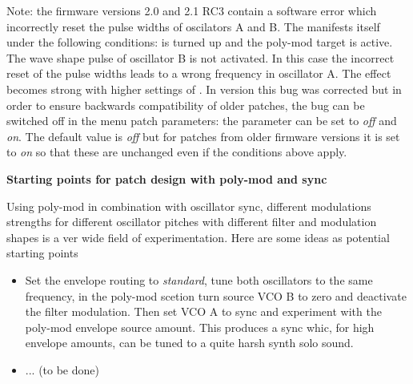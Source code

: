 Note: the firmware versions 2.0 and 2.1 RC3 contain a software error which incorrectly reset the pulse widths of oscilators A and B. The manifests itself under the following conditions: \oscamt is turned up and the poly-mod target \plyfreqa is active. The wave shape pulse of oscillator B is not activated. In this case the incorrect reset of the pulse widths leads to a wrong frequency in oscillator A. The effect becomes strong with higher settings of \oscamt. In version \version this bug was corrected but in order to ensure backwards compatibility of older patches, the bug can be switched off in the menu patch parameters: the parameter \syncbug can be set to \textit{off} and \textit{on}. The default value is \textit{off} but for patches from older firmware versions it is set to \textit{on} so that these are unchanged even if the conditions above apply.    

\textbf{Starting points for patch design with poly-mod and sync}

Using poly-mod in combination with oscillator sync, different modulations strengths for different oscillator pitches with different filter and modulation shapes is a ver wide field of experimentation. Here are some ideas as potential starting points

\begin{itemize}
  \item Set the envelope routing to \textit{standard}, tune both oscillators to the same frequency, in the poly-mod scetion turn source VCO B to zero and deactivate the filter modulation. Then set VCO A to sync and experiment with the poly-mod envelope source amount. This produces a sync whic, for high envelope amounts, can be tuned to a quite harsh synth solo sound.
  \item ... (to be done)
\end{itemize} 
